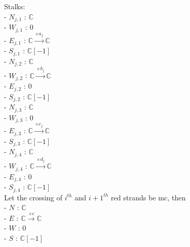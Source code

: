 Stalks:\\
- $N_{j,1}$ : $\mathbb{C}$\\
- $W_{j,1}$ : $0$\\
- $E_{j,1}$ : $\mathbb{C}\xrightarrow{\times a_j} \mathbb{C}$\\
- $S_{j,1}$ : $\mathbb{C}[-1]$\\
- $N_{j,2}$ : $\mathbb{C}$\\
- $W_{j,2}$ : $\mathbb{C}\xrightarrow{\times b_j} \mathbb{C}$\\
- $E_{j,2}$ : $0$\\
- $S_{j,2}$ : $\mathbb{C}[-1]$\\
- $N_{j,3}$ : $\mathbb{C}$\\
- $W_{j,3}$ : $0$\\
- $E_{j,3}$ : $\mathbb{C}\xrightarrow{\times c_j} \mathbb{C}$\\
- $S_{j,3}$ : $\mathbb{C}[-1]$\\
- $N_{j,4}$ : $\mathbb{C}$\\
- $W_{j,4}$ : $\mathbb{C}\xrightarrow{\times d_j} \mathbb{C}$\\
- $E_{j,4}$ : $0$\\
- $S_{j,4}$ : $\mathbb{C}[-1]$\\

Let the crossing of $i^{th}$ and $i+1^{th}$ red strands be mc, then \\

- $N$ : $\mathbb{C}$\\
- $E$ : $\mathbb{C}\xrightarrow{\times c}\mathbb{C}$\\
- $W$ : $0$\\
- $S$ : $\mathbb{C}[-1]$\\

